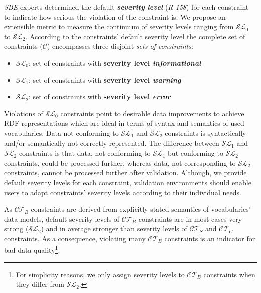 \documentclass{llncs}
\begin{document}
{\emph{SBE} experts determined the default \textbf{\emph{severity level}} (\emph{R-158}) for each constraint to indicate how serious the violation of the constraint is.
We propose an extensible metric to measure the continuum of severity levels ranging from $\mathcal{SL}_{0}$ to $\mathcal{SL}_{2}$.
According to the constraints' default severity level the complete set of constraints ($\mathcal{C}$) encompasses three disjoint \emph{sets of constraints}:
\begin{itemize}
	\item $\mathcal{SL}_{0}$: set of constraints with \textbf{severity level \emph{informational}}
	\item $\mathcal{SL}_{1}$: set of constraints with \textbf{severity level \emph{warning}}
	\item $\mathcal{SL}_{2}$: set of constraints with \textbf{severity level \emph{error}}
\end{itemize}
Violations of $\mathcal{SL}_{0}$ constraints point to desirable data improvements to achieve RDF representations which are ideal in terms of syntax and semantics of used vocabularies. 
Data not conforming to $\mathcal{SL}_{1}$ and $\mathcal{SL}_{2}$ constraints is syntactically and/or semantically not correctly represented.
The difference between $\mathcal{SL}_{1}$ and $\mathcal{SL}_{2}$ constraints is that data, not conforming to $\mathcal{SL}_{1}$ but conforming to $\mathcal{SL}_{2}$ constraints, could be processed further,
whereas data, not corresponding to $\mathcal{SL}_{2}$ constraints, cannot be processed further after validation. 
Although, we provide default severity levels for each constraint, validation environments should enable users to adapt constraints' severity levels according to their individual needs.

As $\mathcal{CT}_{B}$ constraints are derived from explicitly stated semantics of vocabularies' data models, 
default severity levels of $\mathcal{CT}_{B}$ constraints are in most cases very strong ($\mathcal{SL}_{2}$) and 
in average stronger than severity levels of $\mathcal{CT}_{S}$ and $\mathcal{CT}_{C}$ constraints.
As a consequence, violating many $\mathcal{CT}_{B}$ constraints is an indicator for bad data quality\footnote{For simplicity reasons, we only assign severity levels to $\mathcal{CT}_{B}$ constraints when they differ from $\mathcal{SL}_{2}$.}.

%
%
%

}
\end{document}
